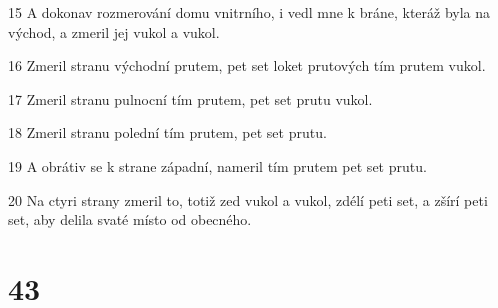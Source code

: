 \par 15 A dokonav rozmerování domu vnitrního, i vedl mne k bráne, kteráž byla na východ, a zmeril jej vukol a vukol.
\par 16 Zmeril stranu východní prutem, pet set loket prutových tím prutem vukol.
\par 17 Zmeril stranu pulnocní tím prutem, pet set prutu vukol.
\par 18 Zmeril stranu polední tím prutem, pet set prutu.
\par 19 A obrátiv se k strane západní, nameril tím prutem pet set prutu.
\par 20 Na ctyri strany zmeril to, totiž zed vukol a vukol, zdélí peti set, a zšírí peti set, aby delila svaté místo od obecného.

\chapter{43}

